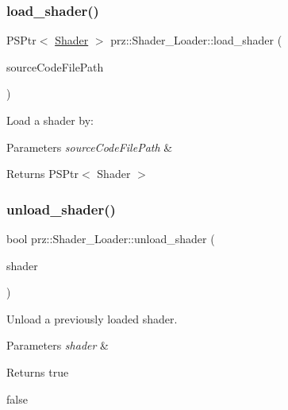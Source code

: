 \subsubsection{\texorpdfstring{load\_shader()}{load\_shader()}}
{\footnotesize\ttfamily P\+S\+Ptr$<$ \mbox{\hyperlink{classprz_1_1_shader}{Shader}} $>$ prz\+::\+Shader\+\_\+\+Loader\+::load\+\_\+shader (\begin{DoxyParamCaption}\item[{const P\+String \&}]{source\+Code\+File\+Path }\end{DoxyParamCaption})}



Load a shader by\+: 


\begin{DoxyParams}{Parameters}
{\em source\+Code\+File\+Path} & \\
\hline
\end{DoxyParams}
\begin{DoxyReturn}{Returns}
P\+S\+Ptr$<$ Shader $>$ 
\end{DoxyReturn}
\mbox{\label{classprz_1_1_shader___loader_abfc5a4768307f2f4d25311e8a0fe602c}} 
\subsubsection{\texorpdfstring{unload\_shader()}{unload\_shader()}\hspace{0.1cm}{\footnotesize\ttfamily [1/2]}}
{\footnotesize\ttfamily bool prz\+::\+Shader\+\_\+\+Loader\+::unload\+\_\+shader (\begin{DoxyParamCaption}\item[{P\+S\+Ptr$<$ \mbox{\hyperlink{classprz_1_1_shader}{Shader}} $>$}]{shader }\end{DoxyParamCaption})\hspace{0.3cm}{\ttfamily [inline]}}



Unload a previously loaded shader. 


\begin{DoxyParams}{Parameters}
{\em shader} & \\
\hline
\end{DoxyParams}
\begin{DoxyReturn}{Returns}
true 

false 
\end{DoxyReturn}
\mbox{\label{classprz_1_1_shader___loader_a5387d5939d4e4049ce2e79e5c0737cda}} 

